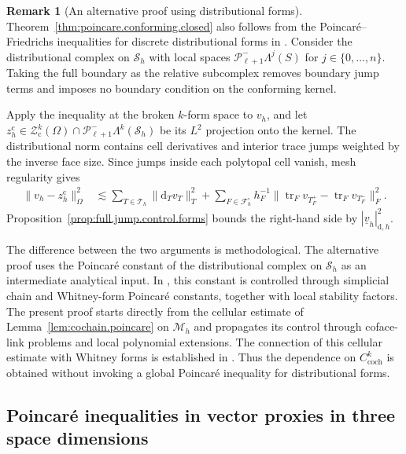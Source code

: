 \documentclass[a4paper,11pt]{article}
\theoremstyle{definition}
\newtheorem{remark}[theorem]{Remark}
\newcommand{\DIFF}{\mathrm{d}}
\newcommand{\Mh}{\mathcal{M}_h}
\newcommand{\Sh}{\mathcal{S}_h}
\newcommand{\PLtrim}[2]{\mathcal{P}_{#1}^{-}\Lambda^{#2}}
\newcommand{\trc}{\operatorname{tr}}
\begin{document}
\begin{remark}[An alternative proof using distributional forms]
\label{rem:distributional.poincare.proof}
Theorem~\ref{thm:poincare.conforming.closed} also follows from the Poincar\'e--Friedrichs inequalities for discrete distributional forms in \cite[Section~6]{Christiansen.Licht:20}.
Consider the distributional complex on $\Sh$ with local spaces
$\PLtrim{\ell+1}{j}(S)$ for $j\in\{0,\ldots,n\}$.
Taking the full boundary as the relative subcomplex removes boundary jump terms and imposes no boundary condition on the conforming kernel.

Apply the inequality at the broken $k$-form space to $v_h$, and let
$z_h^{\mathrm c}\in\mathcal Z_{\mathrm c}^k(\Omega)\cap\PLtrim{\ell+1}{k}(\Sh)$
be its $L^2$ projection onto the kernel.
The distributional norm contains cell derivatives and interior trace jumps weighted by the inverse face size.
Since jumps inside each polytopal cell vanish, mesh regularity gives
\[
\begin{aligned}
  \|v_h-z_h^{\mathrm c}\|_\Omega^2
  &\lesssim
  \sum_{T\in\mathcal T_h}\|\DIFF_Tv_T\|_T^2+
  \sum_{F\in\mathcal F_h^\circ}
  h_F^{-1}
  \|\trc_Fv_{T_F^+}-\trc_Fv_{T_F^-}\|_F^2.
\end{aligned}
\]
Proposition~\ref{prop:full.jump.control.forms} bounds the right-hand side by
$|\underline v_h|_{\DIFF,h}^2$.

The difference between the two arguments is methodological.
The alternative proof uses the Poincar\'e constant of the distributional complex on $\Sh$ as an intermediate analytical input.
In \cite{Christiansen.Licht:20}, this constant is controlled through simplicial chain and Whitney-form Poincar\'e constants, together with local stability factors.
The present proof starts directly from the cellular estimate of Lemma~\ref{lem:cochain.poincare} on $\Mh$ and propagates its control through coface-link problems and local polynomial extensions.
The connection of this cellular estimate with Whitney forms is established in \cite[Section~3.4]{Di-Pietro.Droniou.ea:25}.
Thus the dependence on $C_{\mathrm{coch}}^k$ is obtained without invoking a global Poincar\'e inequality for distributional forms.
\end{remark}

\subsection{Poincar\'e inequalities in vector proxies in three space dimensions}
\label{sec:poincare.vector.proxies}
\end{document}
